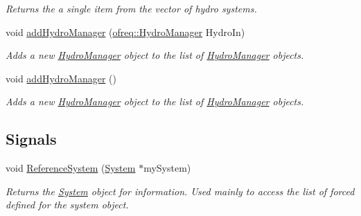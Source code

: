 \begin{DoxyCompactItemize}
\begin{DoxyCompactList}\small\item\em Returns the a single item from the vector of hydro systems. \end{DoxyCompactList}\item 
void \hyperlink{classosea_1_1ofreq_1_1_system_a17e435b7ecbb11045e6e38d82933f0f7}{add\-Hydro\-Manager} (\hyperlink{classosea_1_1ofreq_1_1_hydro_manager}{ofreq\-::\-Hydro\-Manager} Hydro\-In)
\begin{DoxyCompactList}\small\item\em Adds a new \hyperlink{classosea_1_1ofreq_1_1_hydro_manager}{Hydro\-Manager} object to the list of \hyperlink{classosea_1_1ofreq_1_1_hydro_manager}{Hydro\-Manager} objects. \end{DoxyCompactList}\item 
void \hyperlink{classosea_1_1ofreq_1_1_system_a5a41d0d8cbbc9d4fc5bc0a0ffebf279f}{add\-Hydro\-Manager} ()
\begin{DoxyCompactList}\small\item\em Adds a new \hyperlink{classosea_1_1ofreq_1_1_hydro_manager}{Hydro\-Manager} object to the list of \hyperlink{classosea_1_1ofreq_1_1_hydro_manager}{Hydro\-Manager} objects. \end{DoxyCompactList}\end{DoxyCompactItemize}
\subsection*{Signals}
\begin{DoxyCompactItemize}
\item 
void \hyperlink{classosea_1_1ofreq_1_1_system_a0889e1e19fe1c0c52fd385e759e5ecc7}{Reference\-System} (\hyperlink{classosea_1_1ofreq_1_1_system}{System} $\ast$my\-System)
\begin{DoxyCompactList}\small\item\em Returns the \hyperlink{classosea_1_1ofreq_1_1_system}{System} object for information. Used mainly to access the list of forced defined for the system object. \end{DoxyCompactList}\end{DoxyCompactItemize}
